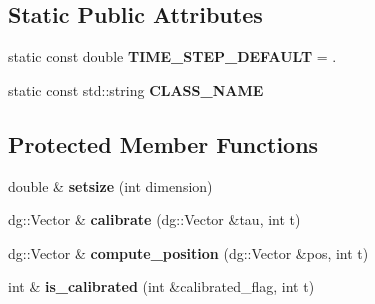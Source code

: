 \subsection*{Static Public Attributes}
\begin{DoxyCompactItemize}
\item 
static const double {\bfseries T\+I\+M\+E\+\_\+\+S\+T\+E\+P\+\_\+\+D\+E\+F\+A\+U\+LT} = .\hypertarget{classdynamicgraph_1_1sot_1_1Calibrator_a83b0865429397e915315d64d4252bfc7}{}\label{classdynamicgraph_1_1sot_1_1Calibrator_a83b0865429397e915315d64d4252bfc7}

\item 
static const std\+::string {\bfseries C\+L\+A\+S\+S\+\_\+\+N\+A\+ME}\hypertarget{classdynamicgraph_1_1sot_1_1Calibrator_a497bce55e9a428360191dad73e5a6ece}{}\label{classdynamicgraph_1_1sot_1_1Calibrator_a497bce55e9a428360191dad73e5a6ece}

\end{DoxyCompactItemize}
\subsection*{Protected Member Functions}
\begin{DoxyCompactItemize}
\item 
double \& {\bfseries setsize} (int dimension)\hypertarget{classdynamicgraph_1_1sot_1_1Calibrator_afffa24b3299ce0c00ab6cd0211ebe10b}{}\label{classdynamicgraph_1_1sot_1_1Calibrator_afffa24b3299ce0c00ab6cd0211ebe10b}

\item 
dg\+::\+Vector \& {\bfseries calibrate} (dg\+::\+Vector \&tau, int t)\hypertarget{classdynamicgraph_1_1sot_1_1Calibrator_ad4e98ac3accc34a9aba4860e592e8bcb}{}\label{classdynamicgraph_1_1sot_1_1Calibrator_ad4e98ac3accc34a9aba4860e592e8bcb}

\item 
dg\+::\+Vector \& {\bfseries compute\+\_\+position} (dg\+::\+Vector \&pos, int t)\hypertarget{classdynamicgraph_1_1sot_1_1Calibrator_a56b6e5491697a0921546d2ed0e8a5947}{}\label{classdynamicgraph_1_1sot_1_1Calibrator_a56b6e5491697a0921546d2ed0e8a5947}

\item 
int \& {\bfseries is\+\_\+calibrated} (int \&calibrated\+\_\+flag, int t)\hypertarget{classdynamicgraph_1_1sot_1_1Calibrator_a6108f4cbaffa18fdb7b47563564511e7}{}\label{classdynamicgraph_1_1sot_1_1Calibrator_a6108f4cbaffa18fdb7b47563564511e7}

\end{DoxyCompactItemize}
